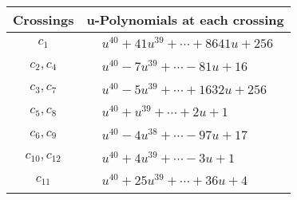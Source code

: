 \documentclass[1p]{elsarticle_modified}
\theoremstyle{definition}
\begin{document}
\begin{tabular}{m{50pt}|m{274pt}}
Crossings & \hspace{64pt}u-Polynomials at each crossing \\
\hline $$\begin{aligned}c_{1}\end{aligned}$$&$\begin{aligned}
&u^{40}+41 u^{39}+\cdots+8641 u+256
\end{aligned}$\\
\hline $$\begin{aligned}c_{2},c_{4}\end{aligned}$$&$\begin{aligned}
&u^{40}-7 u^{39}+\cdots-81 u+16
\end{aligned}$\\
\hline $$\begin{aligned}c_{3},c_{7}\end{aligned}$$&$\begin{aligned}
&u^{40}-5 u^{39}+\cdots+1632 u+256
\end{aligned}$\\
\hline $$\begin{aligned}c_{5},c_{8}\end{aligned}$$&$\begin{aligned}
&u^{40}+u^{39}+\cdots+2 u+1
\end{aligned}$\\
\hline $$\begin{aligned}c_{6},c_{9}\end{aligned}$$&$\begin{aligned}
&u^{40}-4 u^{38}+\cdots-97 u+17
\end{aligned}$\\
\hline $$\begin{aligned}c_{10},c_{12}\end{aligned}$$&$\begin{aligned}
&u^{40}+4 u^{39}+\cdots-3 u+1
\end{aligned}$\\
\hline $$\begin{aligned}c_{11}\end{aligned}$$&$\begin{aligned}
&u^{40}+25 u^{39}+\cdots+36 u+4
\end{aligned}$\\
\hline
\end{tabular}\\~\\
\newpage\renewcommand{\arraystretch}{1}
\end{document}
